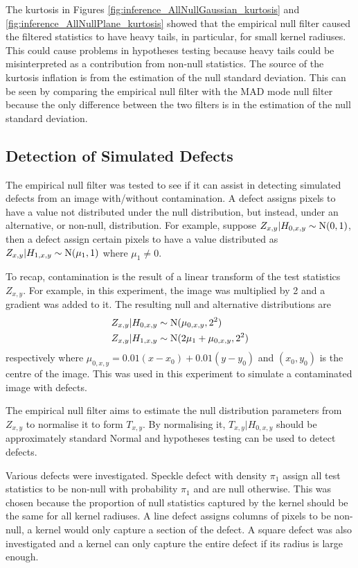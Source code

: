 The kurtosis in Figures \ref{fig:inference_AllNullGaussian_kurtosis} and \ref{fig:inference_AllNullPlane_kurtosis} showed that the empirical null filter caused the filtered statistics to have heavy tails, in particular, for small kernel radiuses. This could cause problems in hypotheses testing because heavy tails could be misinterpreted as a contribution from non-null statistics. The source of the kurtosis inflation is from the estimation of the null standard deviation. This can be seen by comparing the empirical null filter with the MAD mode null filter because the only difference between the two filters is in the estimation of the null standard deviation.

\afterpage{\clearpage}
\subsection{Detection of Simulated Defects}

The empirical null filter was tested to see if it can assist in detecting simulated defects from an image with/without contamination. A defect assigns pixels to have a value not distributed under the null distribution, but instead, under an alternative, or non-null, distribution. For example, suppose $Z_{x,y}|H_{0,x,y}\sim\operatorname{N}(0,1)$, then a defect assign certain pixels to have a value distributed as $Z_{x,y}|H_{1,x,y}\sim\operatorname{N}(\mu_{1},1)$ where $\mu_1\neq0$.

To recap, contamination is the result of a linear transform of the test statistics $Z_{x,y}$. For example, in this experiment, the image was multiplied by 2 and a gradient was added to it. The resulting null and alternative distributions are
\begin{align}
  Z_{x,y}|H_{0,x,y}&\sim\operatorname{N}(\mu_{0,x,y},2^2)
  \\
  Z_{x,y}|H_{1,x,y}&\sim\operatorname{N}(2\mu_1+\mu_{0,x,y},2^2)
\end{align}
respectively where $\mu_{0,x,y}=0.01(x-x_0)+0.01(y-y_0)$ and $(x_0,y_0)$ is the centre of the image. This was used in this experiment to simulate a contaminated image with defects.

The empirical null filter aims to estimate the null distribution parameters from $Z_{x,y}$ to normalise it to form $T_{x,y}$. By normalising it, $T_{x,y}|H_{0,x,y}$ should be approximately standard Normal and hypotheses testing can be used to detect defects.

Various defects were investigated. Speckle defect with density $\pi_1$ assign all test statistics to be non-null with probability $\pi_1$ and are null otherwise. This was chosen because the proportion of null statistics captured by the kernel should be the same for all kernel radiuses. A line defect assigns columns of pixels to be non-null, a kernel would only capture a section of the defect. A square defect was also investigated and a kernel can only capture the entire defect if its radius is large enough.

